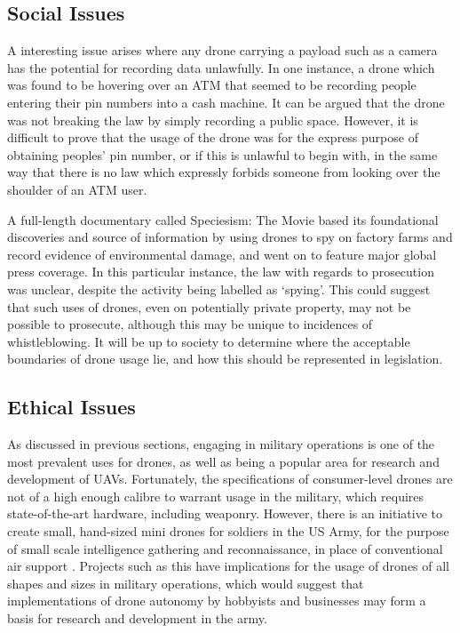 \subsection{Social Issues}
A interesting issue arises where any drone carrying a payload such as a camera has the potential for recording data unlawfully. In one instance, a drone which was found to be hovering over an ATM that seemed to be recording people entering their pin numbers into a cash machine. It can be argued that the drone was not breaking the law by simply recording a public space\cite{maryannrusson2015}. However, it is difficult to prove that the usage of the drone was for the express purpose of obtaining peoples’ pin number, or if this is unlawful to begin with, in the same way that there is no law which expressly forbids someone from looking over the shoulder of an ATM user.

A full-length documentary called Speciesism: The Movie based its foundational discoveries and source of information by using drones to spy on factory farms and record evidence of environmental damage, and went on to feature major global press coverage. In this particular instance, the law with regards to prosecution was unclear, despite the activity being labelled as ‘spying’. This could suggest that such uses of drones, even on potentially private property, may not be possible to prosecute, although this may be unique to incidences of whistleblowing. It will be up to society to determine where the acceptable boundaries of drone usage lie, and how this should be represented in legislation.

\subsection{Ethical Issues}
As discussed in previous sections, engaging in military operations is one of the most prevalent uses for drones, as well as being a popular area for research and development of UAVs. Fortunately, the specifications of consumer-level drones are not of a high enough calibre to warrant usage in the military, which requires state-of-the-art hardware, including weaponry. However, there is an initiative to create small, hand-sized mini drones for soldiers in the US Army, for the purpose of small scale intelligence gathering and reconnaissance, in place of conventional air support \cite{jonfingas2016}. Projects such as this have implications for the usage of drones of all shapes and sizes in military operations, which would suggest that implementations of drone autonomy by hobbyists and businesses may form a basis for research and development in the army.

